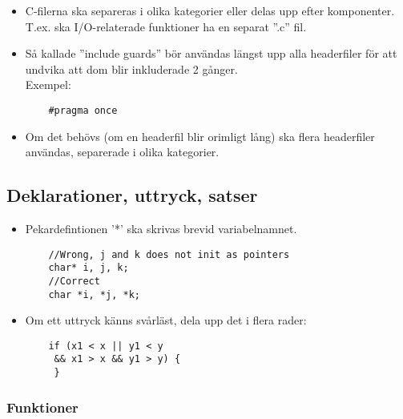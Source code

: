 \documentclass[a4paper]{article}
\begin{document}
    \begin{itemize}

    \item C-filerna ska separeras i olika kategorier eller delas upp efter komponenter. T.ex. ska I/O-relaterade funktioner ha en separat ''.c'' fil. 
    
    \item Så kallade ''include guards'' bör användas längst upp alla headerfiler för att undvika att dom blir inkluderade 2 gånger. \\
    Exempel:
    \begin{lstlisting}
    #pragma once
    \end{lstlisting}
    
    \item Om det behövs (om en headerfil blir orimligt lång) ska flera headerfiler användas, separerade i olika kategorier. 
    
    \end{itemize}
    
\subsection{Deklarationer, uttryck, satser}

    \begin{itemize}
    
    \item Pekardefintionen '*' ska skrivas brevid variabelnamnet.
    \begin{lstlisting}
    //Wrong, j and k does not init as pointers
    char* i, j, k;
    //Correct
    char *i, *j, *k;
    \end{lstlisting}
    
    \item Om ett uttryck känns svårläst, dela upp det i flera rader:
    \begin{lstlisting}
    if (x1 < x || y1 < y 
     && x1 > x && y1 > y) {
     }
    \end{lstlisting}
    
    \end{itemize}
    
    \subsubsection{Funktioner} 
    
\end{document}
